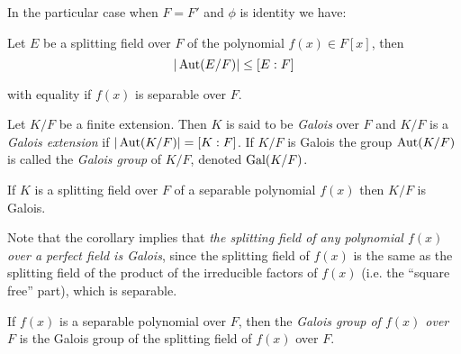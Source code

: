\documentclass[a4paper]{article}
\begin{document}
In the particular case when $F = F'$ and $\phi$ is identity we have:

\begin{proposition}
    Let $E$ be a splitting field over $F$ of the polynomial $f(x) \in F[x]$, then
    \[
        |\operatorname{Aut}(E/F)| \leq [E : F]
    \]

    with equality if $f(x)$ is separable over $F$.
\end{proposition}

\begin{definition}
    Let $K/F$ be a finite extension. Then $K$ is said to be \emph{Galois} over $F$ and $K/F$ is a \emph{Galois extension} if $|\operatorname{Aut}(K/F)| = [K : F]$. If $K/F$ is Galois the group $\operatorname{Aut}(K/F)$ is called the \emph{Galois group} of $K/F$, denoted $\operatorname{Gal}(K/F)$.
\end{definition}

\begin{corollary}
    If $K$ is a splitting field over $F$ of a separable polynomial $f(x)$ then $K/F$ is Galois.
\end{corollary}

Note that the corollary implies that \emph{the splitting field of any polynomial $f(x)$ over a perfect field is Galois}, since the splitting field of $f(x)$ is the same as the splitting field of the product of the irreducible factors of $f(x)$ (i.e. the ``square free'' part), which is separable.

\begin{definition}
    If $f(x)$ is a separable polynomial over $F$, then the \emph{Galois group of $f(x)$ over $F$} is the Galois group of the splitting field of $f(x)$ over $F$.
\end{definition}
\end{document}
